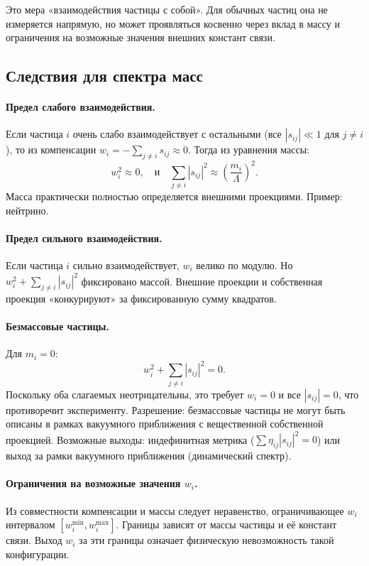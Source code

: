 \documentclass[12pt,a4paper]{article}
\begin{document}
Это мера «взаимодействия частицы с собой». Для обычных частиц она не измеряется напрямую, но может проявляться косвенно через вклад в массу и ограничения на возможные значения внешних констант связи.

\subsection{Следствия для спектра масс}

\paragraph{Предел слабого взаимодействия.}
Если частица $i$ очень слабо взаимодействует с остальными (все $|s_{ij}| \ll 1$ для $j \neq i$), то из компенсации $w_i = -\sum_{j \neq i} s_{ij} \approx 0$. Тогда из уравнения массы:
\begin{equation}
    w_i^2 \approx 0, \quad \text{и} \quad \sum_{j \neq i} |s_{ij}|^2 \approx \left( \frac{m_i}{\Lambda} \right)^2.
\end{equation}
Масса практически полностью определяется внешними проекциями. Пример: нейтрино.

\paragraph{Предел сильного взаимодействия.}
Если частица $i$ сильно взаимодействует, $w_i$ велико по модулю. Но $w_i^2 + \sum_{j \neq i} |s_{ij}|^2$ фиксировано массой. Внешние проекции и собственная проекция «конкурируют» за фиксированную сумму квадратов.

\paragraph{Безмассовые частицы.}
Для $m_i = 0$:
\begin{equation}
    w_i^2 + \sum_{j \neq i} |s_{ij}|^2 = 0.
\end{equation}
Поскольку оба слагаемых неотрицательны, это требует $w_i = 0$ и все $|s_{ij}| = 0$, что противоречит эксперименту. Разрешение: безмассовые частицы не могут быть описаны в рамках вакуумного приближения с вещественной собственной проекцией. Возможные выходы: индефинитная метрика ($\sum \eta_{ij} |s_{ij}|^2 = 0$) или выход за рамки вакуумного приближения (динамический спектр).

\paragraph{Ограничения на возможные значения $w_i$.}
Из совместности компенсации и массы следует неравенство, ограничивающее $w_i$ интервалом $[w_i^{\min}, w_i^{\max}]$. Границы зависят от массы частицы и её констант связи. Выход $w_i$ за эти границы означает физическую невозможность такой конфигурации.
\end{document}
